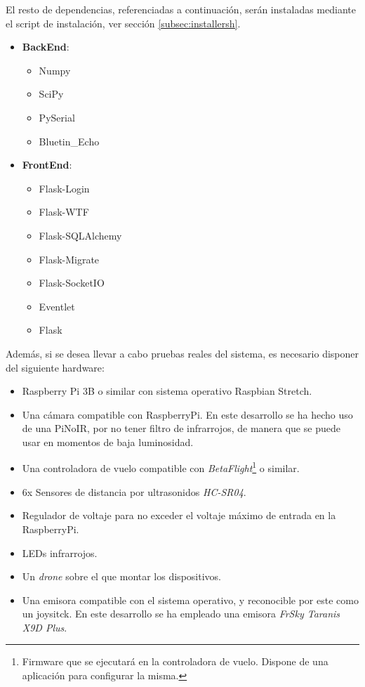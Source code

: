 El resto de dependencias, referenciadas a continuación, serán instaladas mediante el script de instalación, ver sección \ref{subsec:installersh}.
\begin{itemize}
\item \textbf{BackEnd}:
\begin{itemize}
	\item Numpy
	\item SciPy
	\item PySerial
	\item Bluetin\_Echo
\end{itemize}
\item \textbf{FrontEnd}:
\begin{itemize}
	\item Flask-Login
	\item Flask-WTF
	\item Flask-SQLAlchemy
	\item Flask-Migrate
	\item Flask-SocketIO
	\item Eventlet
	\item Flask
\end{itemize}
\end{itemize}


Además, si se desea llevar a cabo pruebas reales del sistema, es necesario disponer del siguiente hardware: 

\begin{itemize}
\item Raspberry Pi 3B o similar con sistema operativo Raspbian Stretch.
\item Una cámara compatible con RaspberryPi. En este desarrollo se ha hecho uso de una PiNoIR, por no tener filtro de infrarrojos, de manera que se puede usar en momentos de baja luminosidad.
\item Una controladora de vuelo compatible con \textit{BetaFlight}\footnote{Firmware que se ejecutará en la controladora de vuelo. Dispone de una aplicación para configurar la misma.} o similar. 
\item 6x Sensores de distancia por ultrasonidos \textit{HC-SR04}.
\item Regulador de voltaje para no exceder el voltaje máximo de entrada en la RaspberryPi. 
\item LEDs infrarrojos.
\item Un \emph{drone} sobre el que montar los dispositivos.
\item Una emisora compatible con el sistema operativo, y reconocible por este como un joysitck. En este desarrollo se ha empleado una emisora \textit{FrSky Taranis X9D Plus}.
\end{itemize}

